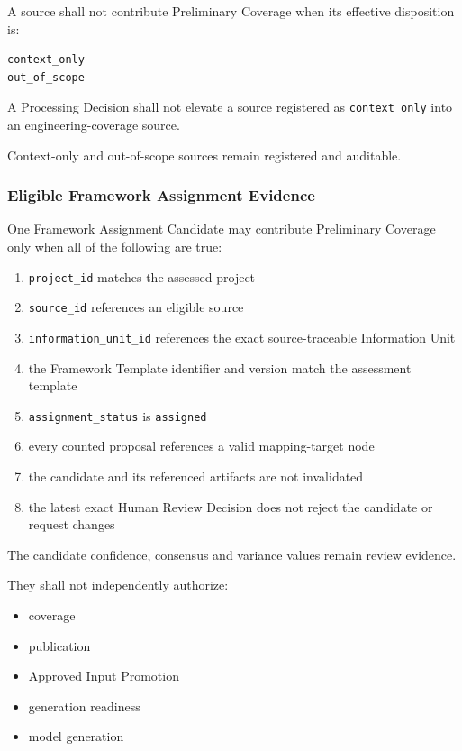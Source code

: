 A source shall not contribute Preliminary Coverage when its effective disposition is:

\begin{verbatim}
context_only
out_of_scope
\end{verbatim}

A Processing Decision shall not elevate a source registered as \texttt{context\_only} into an engineering-coverage source.

Context-only and out-of-scope sources remain registered and auditable.

\hypertarget{eligible-framework-assignment-evidence}{%
\subsubsection{Eligible Framework Assignment Evidence}\label{eligible-framework-assignment-evidence}}

One Framework Assignment Candidate may contribute Preliminary Coverage only when all of the following are true:

\begin{enumerate}
\def\labelenumi{\arabic{enumi}.}
\tightlist
\item
  \texttt{project\_id} matches the assessed project
\item
  \texttt{source\_id} references an eligible source
\item
  \texttt{information\_unit\_id} references the exact source-traceable Information Unit
\item
  the Framework Template identifier and version match the assessment template
\item
  \texttt{assignment\_status} is \texttt{assigned}
\item
  every counted proposal references a valid mapping-target node
\item
  the candidate and its referenced artifacts are not invalidated
\item
  the latest exact Human Review Decision does not reject the candidate or request changes
\end{enumerate}

The candidate confidence, consensus and variance values remain review evidence.

They shall not independently authorize:

\begin{itemize}
\tightlist
\item
  coverage
\item
  publication
\item
  Approved Input Promotion
\item
  generation readiness
\item
  model generation
\end{itemize}

